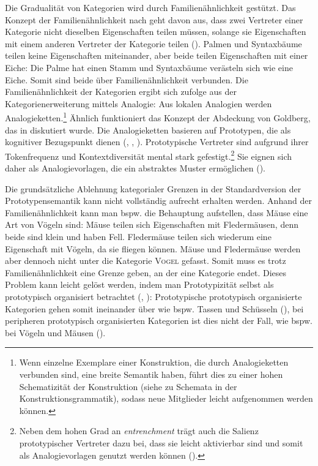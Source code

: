 Die Gradualität von Kategorien wird durch Familienähnlichkeit gestützt. Das Konzept der Familienähnlichkeit nach \textcite{Wittgenstein.2004} geht davon aus, dass zwei Vertreter einer Kategorie nicht dieselben Eigenschaften teilen müssen, solange sie Eigenschaften mit einem anderen Vertreter der Kategorie teilen (\cite[38--40]{Taylor.1995}). Palmen und Syntaxbäume teilen keine Eigenschaften miteinander, aber beide teilen Eigenschaften mit einer Eiche: Die Palme hat einen Stamm und Syntaxbäume verästeln sich wie eine Eiche. Somit sind beide über Familienähnlichkeit verbunden. Die Familienähnlichkeit der Kategorien ergibt sich \textcite[90--91]{Bybee.2010} zufolge aus der Kategorienerweiterung mittels Analogie: Aus lokalen Analogien werden Analogieketten.\footnote{Wenn einzelne Exemplare einer Konstruktion, die durch Analogieketten verbunden sind, eine breite Semantik haben, führt dies zu einer hohen Schematizität  der Konstruktion (siehe  zu Schemata in der Konstruktionsgrammatik), sodass neue Mitglieder leicht aufgenommen werden können.} Ähnlich funktioniert das Konzept der Abdeckung von Goldberg, das in  diskutiert wurde. Die Analogieketten basieren auf Prototypen, die als kognitiver Bezugspunkt dienen (\cite[38--39]{Kleiber.1993}, \cite[89]{Goldberg.2006}, \cite[242]{Ellis.2016}). Prototypische Vertreter sind aufgrund ihrer Tokenfrequenz und Kontextdiversität mental stark gefestigt.\footnote{Neben dem hohen Grad an \textit{entrenchment} trägt auch die Salienz prototypischer Vertreter dazu bei, dass sie leicht aktivierbar sind und somit als Analogievorlagen genutzt werden können (\cite[242]{Ellis.2016}).}  Sie eignen sich daher als Analogievorlagen, die ein abstraktes Muster ermöglichen (\cite[90--91]{Bybee.2010}).\largerpage

Die grundsätzliche Ablehnung kategorialer Grenzen in der Standardversion der Prototypensemantik kann nicht vollständig aufrecht erhalten werden. Anhand der Familienähnlichkeit kann man bspw. die Behauptung aufstellen, dass Mäuse eine Art von Vögeln sind: Mäuse teilen sich Eigenschaften mit Fledermäusen, denn beide sind klein und haben Fell. Fledermäuse teilen sich wiederum eine Eigenschaft mit Vögeln, da sie fliegen können. Mäuse und Fledermäuse werden aber dennoch nicht unter die Kategorie \textsc{Vogel} gefasst. Somit muss es trotz Familienähnlichkeit eine Grenze geben, an der eine Kategorie endet. Dieses Problem kann leicht gelöst werden, indem man Prototypizität selbst als prototypisch organisiert betrachtet (\cite[109--110]{Kleiber.1993}, \cite[65]{Taylor.1995}): Prototypische prototypisch organisierte Kategorien gehen somit ineinander über wie bspw. Tassen und Schüsseln (\cite{Labov.2004}), bei peripheren prototypisch organisierten Kategorien ist dies nicht der Fall, wie bspw. bei Vögeln und Mäusen (\cite[56]{Lakoff.1987}).

